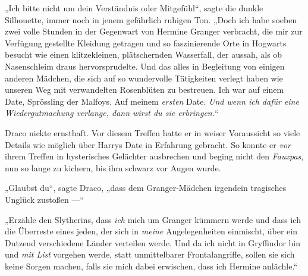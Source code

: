 „Ich bitte nicht um dein Verständnis oder Mitgefühl“, sagte die dunkle Silhouette, immer noch in jenem gefährlich ruhigen Ton.
„Doch ich habe soeben zwei volle Stunden in der Gegenwart von Hermine Granger verbracht, die mir zur Verfügung gestellte Kleidung getragen und so faszinierende Orte in Hogwarts besucht wie einen klitzekleinen, plätschernden Wasserfall, der aussah, als ob Nasenschleim draus hervorsprudelte. Und das alles in Begleitung von einigen anderen Mädchen, die sich auf so wundervolle Tätigkeiten verlegt haben wie unseren Weg mit verwandelten Rosenblüten zu bestreuen. Ich war auf einem Date, Sprössling der Malfoys. Auf meinem \emph{ersten} Date. \emph{Und wenn ich dafür eine Wiedergutmachung verlange, dann wirst du sie erbringen.}“

Draco nickte ernsthaft. Vor diesem Treffen hatte er in weiser Voraussicht so viele Details wie möglich über Harrys Date in Erfahrung gebracht. So konnte er \emph{vor} ihrem Treffen in hysterisches Gelächter ausbrechen und beging nicht den \emph{Fauxpas}, nun so lange zu kichern, bis ihm schwarz vor Augen wurde.

„Glaubst du“, sagte Draco, „dass dem Granger-Mädchen irgendein tragisches Unglück zustoßen —“

„Erzähle den Slytherins, dass \emph{ich} mich um Granger kümmern werde und dass ich die Überreste eines jeden, der sich in \emph{meine} Angelegenheiten einmischt, über ein Dutzend verschiedene Länder verteilen werde. Und da ich nicht in Gryffindor bin und \emph{mit List} vorgehen werde, statt unmittelbarer Frontalangriffe, sollen sie sich keine Sorgen machen, falls sie mich dabei erwischen, dass ich Hermine anlächle.“

